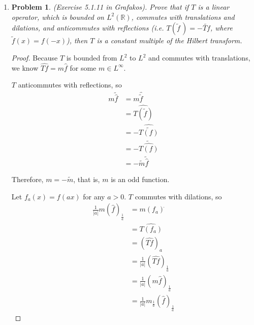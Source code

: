 \documentclass[a4paper]{article}
\newtheorem*{problem}{Problem}
\newcommand{\la}{\left \langle}
\newcommand{\ra}{\right \rangle}
\begin{document}
\begin{enumerate}
\begin{proof}
    Taking Fourier Transforms, we have
    \[ \la \mathcal{F} [ (1-n) \textup{ p.v. } \frac{x_j}{|x|^{n+1}} ], f \ra = \la \frac{\pi^{\frac{n+1}{2}}}{\Gamma \left( \frac{n+1}{2} \right)}
    (1-n) \mathcal{F} (W_j) , f \ra, \]
    and
    \begin{align*}
      \la \mathcal{F} [\partial_j |x|^{-n+1}], f \ra &= \la 2 \pi i \xi_j \mathcal{F}[ |x|^{-n+1}], f \ra \\
      &= \la 2 \pi i \frac{\pi^{\frac{n-1}{2}}}{\Gamma \left( \frac{n-1}{2} \right)} \frac{\xi_j}{|\xi|}, f \ra \quad \parbox{5cm}{by Theorem
      2.4.6 in Grafakos}
    \end{align*}

    Using properties of the Gamma function, we then have
    \[ \widehat{W}_j = -i \frac{\xi_j}{|\xi|} \]
    as distributions.

  \end{proof}

\item
  \begin{problem}
    (Exercise 5.1.11 in Grafakos). Prove that if $T$ is a linear operator, which is bounded on $L^2 (\mathbb R)$, commutes with translations and dilations, and anticommutes with reflections (i.e. $ T (\widetilde{f}\,) = - \widetilde{Tf}$, where $\widetilde{f} (x) = f (-x)$), then $T$ is a constant multiple of the Hilbert transform.
  \end{problem}

  \begin{proof}

    Because $T$ is bounded from $L^2$ to $L^2$ and commutes with translations, we know $\widehat{Tf} = m \widehat{f}$ for some $m \in L^\infty$.

    $T$ anticommutes with reflections, so
    \begin{align*}
      m \tilde{\widehat{f}} &= m \widehat{\tilde{f}} \\
      &= \widehat{T( \tilde{f} ) } \\
      &= - \widehat{ \tilde{T(f)} } \\
      &= - \tilde{ \widehat{T(f)} } \\
      &= - \tilde{m} \tilde{ \widehat{f} }
    \end{align*}

    Therefore, $m = - \tilde{m}$, that is, $m$ is an odd function.

    Let $f_a(x) = f(ax)$ for any $a>0$. $T$ commutes with dilations, so
    \begin{align*}
      \frac{1}{|a|} m \left( \widehat{f} \right)_{\frac{1}{a}} &= m (f_a)^{\widehat{}} \\
      &= \widehat{T(f_a)} \\
      &= \left( \widehat{Tf} \right)_a \\
      &= \frac{1}{|a|} \left( \widehat{Tf} \right)_{\frac{1}{a}} \\
      &= \frac{1}{|a|} ( m \widehat{f} )_{\frac{1}{a}} \\
      &= \frac{1}{|a|} m_{\frac{1}{a}} ( \widehat{f} )_{\frac{1}{a}}
    \end{align*}


\end{proof}
\end{enumerate}
\end{document}
